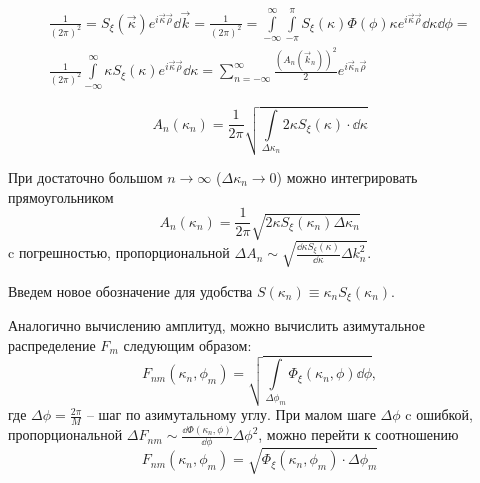 \begin{gather}
    \frac{1}{(2 \pi)^2} = S_{\xi}(\vec \kappa) e^{i \vec \kappa \vec \rho} \dd \vec k = 
    \frac{1}{(2 \pi)^2} = 
        \int\limits_{-\infty}^{\infty}
        \int\limits_{- \pi}^{\pi} 
    S_\xi(\kappa) \Phi(\phi) \kappa e^{i \vec \kappa\vec \rho} \dd \kappa \dd \phi = \\
    \frac{1}{(2 \pi)^2} \int\limits_{-\infty}^{\infty} \kappa S_\xi
    (\kappa) e^{i \vec \kappa 
    \vec \rho} \dd \kappa = \sum\limits_{n=-\infty}^{\infty} \frac{(A_n(\vec
k_n))^2}{2} e^{i \vec \kappa_n \vec \rho} 
\end{gather}

\begin{equation}
    \label{eq:Amplitude}
    A_n(\kappa_n) = \frac{1}{2 \pi} \sqrt{\int\limits_{\Delta \kappa_n} 2
        \kappa S_\xi(\kappa)
    \cdot \dd \kappa}
\end{equation}

При достаточно большом $n \to \infty$ ($\Delta \kappa_n \to 0$) можно интегрировать
прямоугольником
\begin{equation}
    A_n(\kappa_n) = \frac{1}{2 \pi} \sqrt{ 2 \kappa S_\xi(\kappa_n) \Delta
    \kappa_n}
\end{equation}
c погрешностью, пропорциональной $\Delta A_n \sim  \sqrt{\frac{\dd \kappa
    S_\xi(\kappa)}{\dd \kappa}
\Delta k_n^2}$. 

Введем новое
обозначение для удобства $S(\kappa_n)\equiv \kappa_n S_\xi (\kappa_n)$.

Аналогично вычислению амплитуд, можно вычислить азимутальное распределение $F_m$  следующим образом:
\begin{equation}
    F_{nm}(\kappa_n,\phi_m) = \sqrt{\int\limits_{\Delta \phi_m}
    \Phi_{\xi}(\kappa_n,\phi) \dd \phi},
\end{equation}
где $\Delta \phi = \frac{2\pi}{M}$ -- шаг по азимутальному углу.
При малом шаге  $\Delta \phi$ c ошибкой, пропорциональной $\Delta F_{nm} \sim
\frac{\dd \Phi(\kappa_n,\phi)}{\dd \phi} \Delta \phi^2$, можно перейти к соотношению
\begin{equation}
    F_{nm} (\kappa_n,\phi_m) = \sqrt{\Phi_\xi(\kappa_n,\phi_m) \cdot \Delta \phi_m}
\end{equation}


